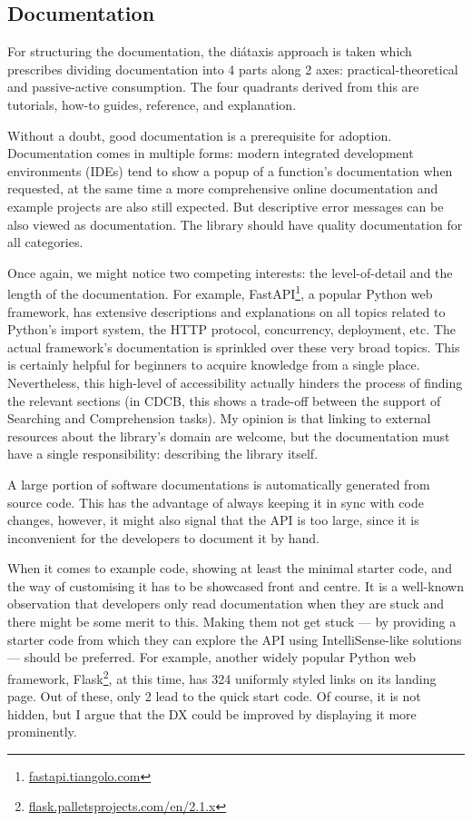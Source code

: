 \subsection{Documentation}

For structuring the documentation, the diátaxis approach is taken \cite{Procida_Diataxis_documentation_framework} which prescribes dividing documentation into 4 parts along 2 axes: practical-theoretical and passive-active consumption. The four quadrants derived from this are tutorials, how-to guides, reference, and explanation.

Without a doubt, good documentation is a prerequisite for adoption. Documentation comes in multiple forms: modern integrated development environments (IDEs) tend to show a popup of a function's documentation when requested, at the same time a more comprehensive online documentation and example projects are also still expected. But descriptive error messages can be also viewed as documentation. The library should have quality documentation for all categories.

Once again, we might notice two competing interests: the level-of-detail and the length of the documentation. For example, FastAPI\footnote{\href{https://fastapi.tiangolo.com/async/\#concurrent-burgers}{fastapi.tiangolo.com}}, a popular Python web framework, has extensive descriptions and explanations on all topics related to Python's import system, the HTTP protocol, concurrency, deployment, etc. The actual framework's documentation is sprinkled over these very broad topics. This is certainly helpful for beginners to acquire knowledge from a single place. Nevertheless, this high-level of accessibility actually hinders the process of finding the relevant sections (in CDCB, this shows a trade-off between the support of Searching and Comprehension tasks). My opinion is that linking to external resources about the library's domain are welcome, but the documentation must have a single responsibility: describing the library itself.

A large portion of software documentations is automatically generated from source code. This has the advantage of always keeping it in sync with code changes, however, it might also signal that the API is too large, since it is inconvenient for the developers to document it by hand.

When it comes to example code, showing at least the minimal starter code, and the way of customising it has to be showcased front and centre. It is a well-known observation that developers only read documentation when they are stuck and there might be some merit to this. Making them not get stuck --- by providing a starter code from which they can explore the API using IntelliSense-like solutions --- should be preferred. For example, another widely popular Python web framework, Flask\footnote{\href{https://flask.palletsprojects.com/en/2.1.x/}{flask.palletsprojects.com/en/2.1.x}}, at this time, has 324 uniformly styled links on its landing page. Out of these, only 2 lead to the quick start code. Of course, it is not hidden, but I argue that the DX could be improved by displaying it more prominently.

